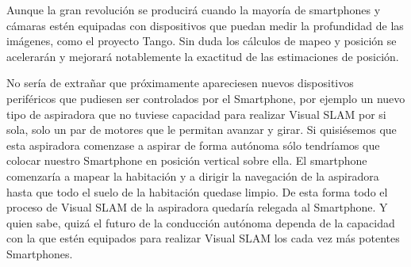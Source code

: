 Aunque la gran revolución se producirá cuando la mayoría de smartphones y cámaras estén equipadas con dispositivos que puedan medir la profundidad de las imágenes, como el proyecto Tango. Sin duda los cálculos de mapeo y posición se acelerarán y mejorará notablemente la exactitud de las estimaciones de posición.

 No sería de extrañar que próximamente apareciesen nuevos dispositivos periféricos que pudiesen ser controlados por el Smartphone, por ejemplo un nuevo tipo de aspiradora que no tuviese capacidad para realizar Visual SLAM por si sola, solo un par de motores que le permitan avanzar y girar. Si quisiésemos que esta aspiradora comenzase a aspirar de forma autónoma sólo tendríamos que colocar nuestro Smartphone en posición vertical sobre ella. El smartphone comenzaría a mapear la habitación y a dirigir la navegación de la aspiradora hasta que todo el suelo de la habitación quedase limpio. De esta forma todo el proceso de Visual SLAM de la aspiradora quedaría relegada al Smartphone. Y quien sabe, quizá el futuro de la conducción autónoma dependa de la capacidad con la que estén equipados para realizar Visual SLAM los cada vez más potentes Smartphones.
